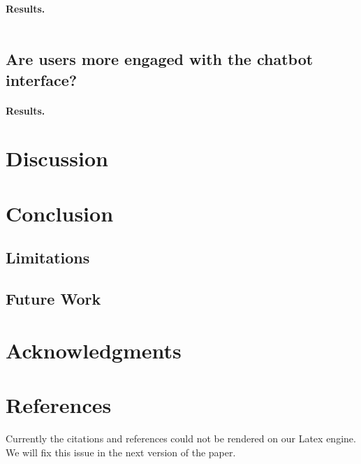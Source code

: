 \documentclass{article}
\newcounter{para}
\begin{document}

\paragraph{Results.}

\begin{table} \label{tab:model-comparison}
  \centering
  \begin{tabular}{lll}

  \end{tabular}
\end{table}

\subsection{Are users more engaged with the chatbot interface?} \label{sec:engagement}

\paragraph{Results.}

\section{Discussion}
\section{Conclusion}
\subsection{Limitations}
\subsection{Future Work}

\section*{Acknowledgments}
\section*{References}
%
%
Currently the citations and references could not be rendered on our Latex engine. We will fix this issue in the next version of the paper.
\end{document}
